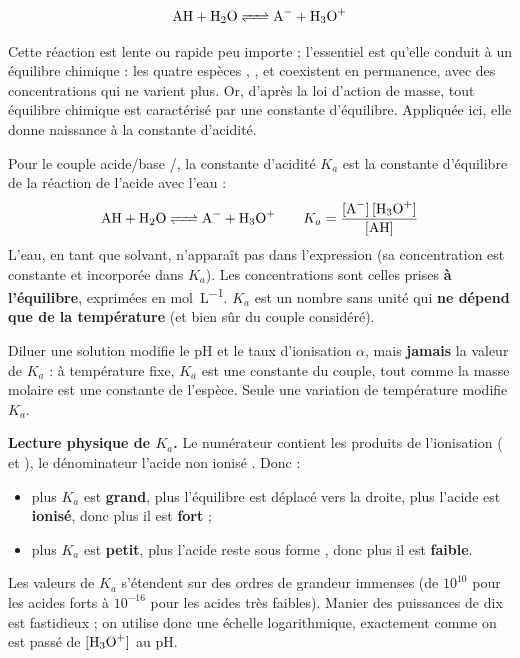 \documentclass[11pt]{article}
\newcommand{\cle}[1]{{\popxbold\color{popdark}#1}}
\newcounter{popsec}
\newcounter{popsub}
\newcommand{\courssub}[1]{%
  \stepcounter{popsub}%
  \par\vspace{9pt}\noindent{\popxbold\fontsize{11.5}{13}\selectfont\color{popink}{\color{poporange}\thepopsec.\thepopsub}\hspace{6pt}#1}\par\nopagebreak\vspace{4pt}
}
\begin{document}
\[ \ce{AH + H2O <=> A- + H3O+} \]

Cette réaction est lente ou rapide peu importe ; l'essentiel est qu'elle conduit à un \cle{équilibre chimique} : les quatre espèces , ,  et  coexistent en permanence, avec des concentrations qui ne varient plus. Or, d'après la loi d'action de masse, tout équilibre chimique est caractérisé par une constante d'équilibre. Appliquée ici, elle donne naissance à la constante d'acidité.

\begin{definition}
Pour le couple acide/base /, la \cle{constante d'acidité} $K_a$ est la constante d'équilibre de la réaction de l'acide avec l'eau :
\[ \ce{AH + H2O <=> A- + H3O+} \qquad K_a = \frac{[\ce{A-}]\,[\ce{H3O+}]}{[\ce{AH}]} \]
L'eau, en tant que solvant, n'apparaît pas dans l'expression (sa concentration est constante et incorporée dans $K_a$). Les concentrations sont celles prises \textbf{à l'équilibre}, exprimées en \si{mol.L^{-1}}. $K_a$ est un nombre sans unité qui \textbf{ne dépend que de la température} (et bien sûr du couple considéré).
\end{definition}

\begin{attention}
Diluer une solution modifie le pH et le taux d'ionisation $\alpha$, mais \textbf{jamais} la valeur de $K_a$ : à température fixe, $K_a$ est une constante du couple, tout comme la masse molaire est une constante de l'espèce. Seule une variation de température modifie $K_a$.
\end{attention}

\textbf{Lecture physique de $K_a$.} Le numérateur contient les produits de l'ionisation ( et ), le dénominateur l'acide non ionisé . Donc :
\begin{itemize}
\item plus $K_a$ est \textbf{grand}, plus l'équilibre est déplacé vers la droite, plus l'acide est \textbf{ionisé}, donc plus il est \textbf{fort} ;
\item plus $K_a$ est \textbf{petit}, plus l'acide reste sous forme , donc plus il est \textbf{faible}.
\end{itemize}

\courssub{Le $pK_a$ : une échelle plus commode}

Les valeurs de $K_a$ s'étendent sur des ordres de grandeur immenses (de $10^{10}$ pour les acides forts à $10^{-16}$ pour les acides très faibles). Manier des puissances de dix est fastidieux ; on utilise donc une échelle logarithmique, exactement comme on est passé de $[\ce{H3O+}]$ au pH.
\end{document}
